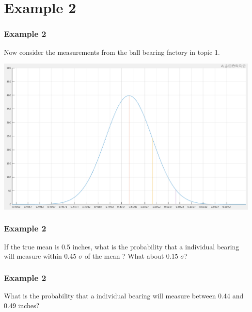 \documentclass[fleqn]{beamer} %
\newcommand{\sectiontitleIII}{Example 2}
\begin{document}
\section{\sectiontitleIII}	

	\begin{frame}[label=sectionIII] \small
		\frametitle{\sectiontitleIII}    
		
		Now consider the measurements from the ball bearing factory in topic 1. 
		
		\includegraphics[scale=.2]{topic3_fig1.png}	
	
		
			
		
		\vspace{30mm}
		
		
		

	\end{frame}

	\begin{frame}[label=sectionIII] \small
		\frametitle{\sectiontitleIII}    
		
		
	If the true mean is 0.5 inches, what is the probability that a individual bearing will measure within 0.45 $\sigma$ of the mean ? What about 0.15 $\sigma$? \\
		\vspace{30mm}

	\end{frame}

	\begin{frame}[label=sectionIII] \small
		\frametitle{\sectiontitleIII}    
	
		What is the probability that a individual bearing will measure between 0.44 and 0.49 inches? 

	\end{frame}
\end{document}
